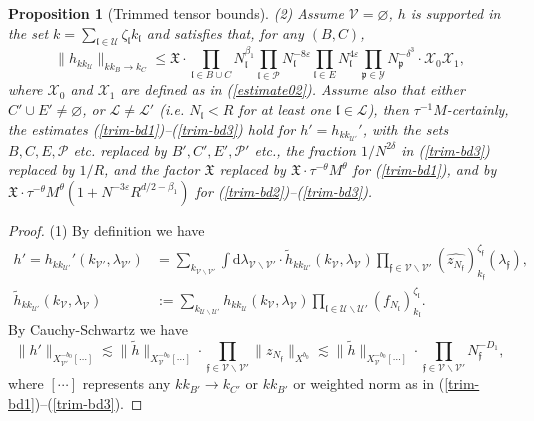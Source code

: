 \documentclass[11 pt,reqno]{amsart}
\newtheorem{prop}[thm]{Proposition}
\theoremstyle{definition}
\theoremstyle{remark}
\numberwithin{equation}{section}
\newcommand{\Lc}{\mathcal{L}}
\newcommand{\Pc}{\mathcal{P}}
\newcommand{\Uc}{\mathcal{U}}
\newcommand{\Vc}{\mathcal{V}}
\newcommand{\Xc}{\mathcal{X}}
\newcommand{\Yc}{\mathcal{Y}}
\newcommand{\pf}{\mathfrak{p}}
\newcommand{\ff}{\mathfrak{f}}
\newcommand{\Xf}{\mathfrak{X}}
\newcommand{\lf}{\mathfrak{l}}
\begin{document}
{\begin{prop}[Trimmed tensor bounds]
 (2) Assume $\Vc=\varnothing$, $h$ is supported in the set $k=\sum_{\lf\in\Uc}\zeta_\lf k_\lf$ and satisfies that, for any $(B,C)$,
 \begin{equation}
 \label{trim-bd5}\|h_{kk_\Uc}\|_{kk_B\to k_C}\leq\Xf\cdot \prod_{\lf\in B\cup C}N_\lf^{\beta_1}\prod_{\lf\in\Pc}N_\lf^{-8\varepsilon}\prod_{\lf\in E}N_\lf^{4\varepsilon}\prod_{\pf\in\Yc}N_\pf^{-\delta^3}\cdot\Xc_0\Xc_1,
 \end{equation} where $\Xc_0$ and $\Xc_1$ are defined as in (\ref{estimate02}). Assume also that either $C'\cup E'\neq\varnothing$, or $\Lc\neq\Lc'$ (i.e. $N_\lf<R$ for at least one $\lf\in\Lc$), then $\tau^{-1}M$-certainly, the estimates (\ref{trim-bd1})--(\ref{trim-bd3}) hold for $h'=h_{kk_{\Uc'}}'$, with the sets $B,C,E,\Pc$ etc. replaced by $B',C',E',\Pc'$ etc., the fraction $1/N^{2\delta}$ in (\ref{trim-bd3}) replaced by $1/R$, and the factor $\Xf$ replaced by $\Xf\cdot \tau^{-\theta}M^\theta $ for (\ref{trim-bd1}), and by $\Xf\cdot \tau^{-\theta}M^\theta (1+N^{-3\varepsilon}R^{d/2-\beta_1})$ for (\ref{trim-bd2})--(\ref{trim-bd3}).
  \end{prop}
  \begin{proof} (1) By definition we have
\begin{equation}\label{trimexpand}
\begin{split} h'=h_{kk_{\Uc'}}'(k_{\Vc'},\lambda_{\Vc'})&=\sum_{k_{\Vc\backslash\Vc'}}\int\mathrm{d}\lambda_{\Vc\backslash\Vc'}\cdot \widetilde{h}_{kk_{\Uc'}}(k_{\Vc},\lambda_{\Vc})\prod_{\ff\in\Vc\backslash\Vc'}(\widehat{z_{N_\ff}})_{k_\ff}^{\zeta_\ff}(\lambda_\ff),\\
\widetilde{h}_{kk_{\Uc'}}(k_{\Vc},\lambda_{\Vc})&:=\sum_{k_{\Uc\backslash\Uc'}}h_{kk_\Uc}(k_\Vc,\lambda_\Vc)\prod_{\lf\in\Uc\backslash\Uc'}(f_{N_\lf})_{k_\lf}^{\zeta_\lf}.
\end{split}\end{equation} By Cauchy-Schwartz we have 
\begin{equation}\label{blostep0}\|h'\|_{X_{\Vc'}^{-b_0}[\cdots]}\lesssim\|\widetilde{h}\|_{X_\Vc^{-b_0}[\cdots]}\cdot\prod_{\ff\in\Vc\backslash\Vc'}\|z_{N_\ff}\|_{X^{b_0}}\lesssim \|\widetilde{h}\|_{X_\Vc^{-b_0}[\cdots]}\cdot\prod_{\ff\in\Vc\backslash\Vc'} N_\ff^{-D_1},\end{equation} where $[\cdots]$ represents any $kk_{B'}\to k_{C'}$ or $kk_{B'}$ or weighted norm as in (\ref{trim-bd1})--(\ref{trim-bd3}).


\end{proof}}
\end{document}
